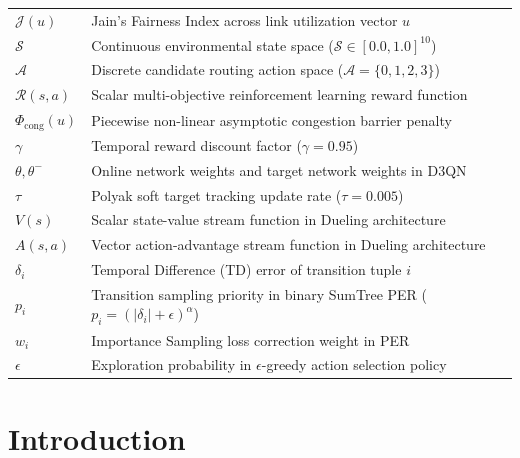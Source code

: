 \documentclass[12pt,a4paper,oneside]{report}
\begin{document}
\begin{tabular}{ll}
$\mathcal{J}(u)$ & Jain's Fairness Index across link utilization vector $u$ \\
$\mathcal{S}$ & Continuous environmental state space ($\mathcal{S} \in [0.0, 1.0]^{10}$) \\
$\mathcal{A}$ & Discrete candidate routing action space ($\mathcal{A} = \{0, 1, 2, 3\}$) \\
$\mathcal{R}(s, a)$ & Scalar multi-objective reinforcement learning reward function \\
$\Phi_{\text{cong}}(u)$ & Piecewise non-linear asymptotic congestion barrier penalty \\
$\gamma$ & Temporal reward discount factor ($\gamma = 0.95$) \\
$\theta, \theta^-$ & Online network weights and target network weights in D3QN \\
$\tau$ & Polyak soft target tracking update rate ($\tau = 0.005$) \\
$V(s)$ & Scalar state-value stream function in Dueling architecture \\
$A(s, a)$ & Vector action-advantage stream function in Dueling architecture \\
$\delta_i$ & Temporal Difference (TD) error of transition tuple $i$ \\
$p_i$ & Transition sampling priority in binary SumTree PER ($p_i = (|\delta_i| + \epsilon)^\alpha$) \\
$w_i$ & Importance Sampling loss correction weight in PER \\
$\epsilon$ & Exploration probability in $\epsilon$-greedy action selection policy \\
\end{tabular}

\newpage
{}
\setcounter{page}{1}

\chapter{Introduction}
\label{chap:intro}
\end{document}
